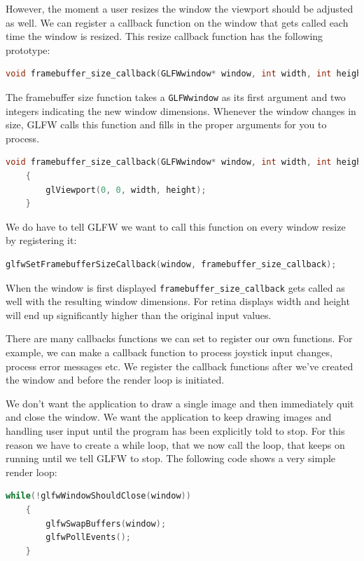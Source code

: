 However, the moment a user resizes the window the viewport should be adjusted as well. We can register a callback function on the window that gets called each time the window is resized. This resize callback function has the following prototype:

\begin{lstlisting}[language=C++]
    void framebuffer_size_callback(GLFWwindow* window, int width, int height); 
\end{lstlisting}

The framebuffer size function takes a \verb|GLFWwindow| as its first argument and two integers indicating the new window dimensions. Whenever the window changes in size, GLFW calls this function and fills in the proper arguments for you to process.

\begin{lstlisting}[language=C++]
    void framebuffer_size_callback(GLFWwindow* window, int width, int height)
    {
        glViewport(0, 0, width, height);
    }  
\end{lstlisting}

We do have to tell GLFW we want to call this function on every window resize by registering it:

\begin{lstlisting}[language=C++]
    glfwSetFramebufferSizeCallback(window, framebuffer_size_callback); 
\end{lstlisting}

When the window is first displayed \verb|framebuffer_size_callback| gets called as well with the resulting window dimensions. For retina displays width and height will end up significantly higher than the original input values.

There are many callbacks functions we can set to register our own functions. For example, we can make a callback function to process joystick input changes, process error messages etc. We register the callback functions after we've created the window and before the render loop is initiated.

We don't want the application to draw a single image and then immediately quit and close the window. We want the application to keep drawing images and handling user input until the program has been explicitly told to stop. For this reason we have to create a while loop, that we now call the  loop, that keeps on running until we tell GLFW to stop. The following code shows a very simple render loop:

\begin{lstlisting}[language=C++]
    while(!glfwWindowShouldClose(window))
    {
        glfwSwapBuffers(window);
        glfwPollEvents();    
    }
\end{lstlisting}

